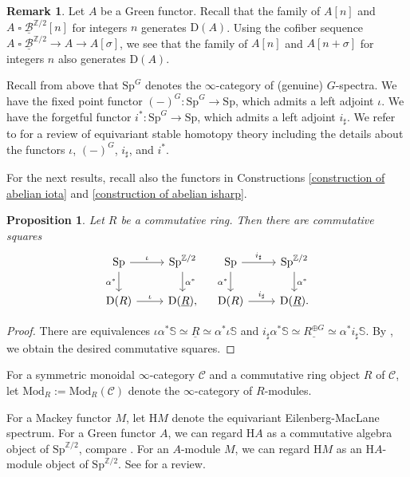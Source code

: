 \documentclass[10pt]{amsart}
\newtheorem{prop}[thm]{Proposition}
\theoremstyle{definition}
\newtheorem{rmk}[thm]{Remark}
\numberwithin{equation}{section}
\newcommand{\Sphere}{\mathbb{S}}
\newcommand{\Z}{\mathbb{Z}}
\newcommand{\cB}{\mathcal{B}}
\newcommand{\cC}{\mathcal{C}}
\newcommand{\rD}{\mathrm{D}}
\newcommand{\rH}{\mathrm{H}}
\newcommand{\ul}{\underline}
\newcommand{\Mod}{\mathrm{Mod}}
\newcommand{\Sp}{\mathrm{Sp}}
\DeclareMathOperator{\sotimes}{\square}
\begin{document}
\begin{rmk}
\label{another generators}
Let $A$ be a Green functor.
Recall that the family of $A[n]$ and $A \sotimes \ul{\cB}^{\Z/2}[n]$ for integers $n$ generates $\rD(A)$.
Using the cofiber sequence $A \sotimes \ul{\cB}^{\Z/2}\to A \to A[\sigma]$,
we see that the family of $A[n]$ and $A[n+\sigma]$ for integers $n$ also generates $\rD(A)$. 
\end{rmk}



Recall from above that $\Sp^G$ denotes the $\infty$-category of (genuine) $G$-spectra.
We have the fixed point functor $(-)^G\colon \Sp^G\to \Sp$,
which admits a left adjoint $\iota$.
We have the forgetful functor $i^*\colon \Sp^G\to \Sp$,
which admits a left adjoint $i_\sharp$.
We refer to \cite[appendix A]{HP23} for a review of equivariant stable homotopy theory including the details about the functors $\iota$, $(-)^G$, $i_\sharp$, and $i^*$.

For the next results,
recall also the functors in Constructions \ref{construction of abelian iota} and \ref{construction of abelian isharp}.

\begin{prop}
\label{alpha isharp}
Let $R$ be a commutative ring.
Then there are commutative squares
\[
\begin{tikzcd}
\Sp\ar[d,"\alpha^*"']\ar[r,"\iota"]&
\Sp^{\Z/2}\ar[d,"\alpha^*"]
\\
\rD(R)\ar[r,"\iota"]&
\rD(\ul{R}),
\end{tikzcd}
\quad
\begin{tikzcd}
\Sp\ar[d,"\alpha^*"']\ar[r,"i_\sharp"]&
\Sp^{\Z/2}\ar[d,"\alpha^*"]
\\
\rD(R)\ar[r,"i_\sharp"]&
\rD(\ul{R}).
\end{tikzcd}
\]
\end{prop}
\begin{proof}
There are equivalences
$
\iota \alpha^* \Sphere \simeq \ul{R} \simeq \alpha^* \iota \Sphere
$
and
$
i_\sharp \alpha^* \Sphere \simeq \ul{R^{\oplus G}} \simeq \alpha^* i_\sharp \Sphere
$.
By \cite[Corollary 1.4.4.6]{HA},
we obtain the desired commutative squares.
\end{proof}



For a symmetric monoidal $\infty$-category $\cC$ and a commutative ring object $R$ of $\cC$,
let $\Mod_R:=\Mod_R(\cC)$ denote the $\infty$-category of $R$-modules.

For a Mackey functor $M$,
let $\rH M$ denote the equivariant Eilenberg-MacLane spectrum.
For a Green functor $A$,
we can regard $\rH A$ as a commutative algebra object of $\Sp^{\Z/2}$, compare \cite[section A.4]{HP23}.
For an $A$-module $M$,
we can regard $\rH M$ as an $\rH A$-module object of $\Sp^{\Z/2}$.
See \cite[sections A.3, A.4]{HP23} for a review.
\end{document}
